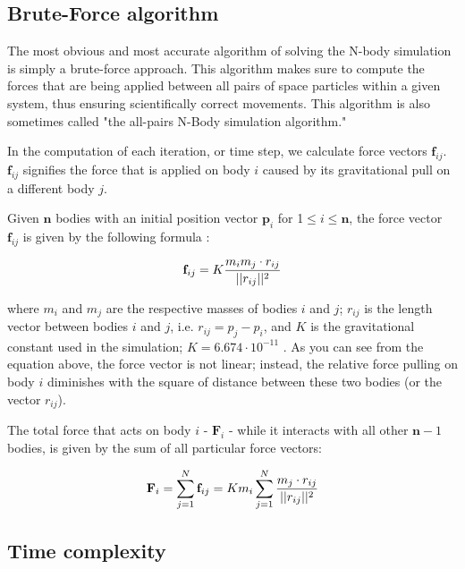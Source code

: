 \documentclass[journal]{IEEEtran}
\begin{document}
	\subsection*{Brute-Force algorithm}
		The most obvious and most accurate algorithm of solving the N-body simulation is simply a brute-force approach. This algorithm makes sure to compute the forces that are being applied between all pairs of space particles within a given system, thus ensuring scientifically correct movements. This algorithm is also sometimes called "the all-pairs N-Body simulation algorithm."
		
		In the computation of each iteration, or time step, we calculate force vectors $\textbf{f}_{ij}$. $\textbf{f}_{ij}$ signifies the force that is applied on body $i$ caused by its gravitational pull on a different body $j$. 
		
		Given $\textbf{n}$ bodies with an initial position vector $\textbf{p}_{i}$ for 1$ \leq i \leq \textbf{n}$, the force vector $\textbf{f}_{ij}$ is given by the following formula \cite{nvidia-article}:
		
		\begin{equation}
		\centering
			\textbf{f}_{ij} = K \frac{m_i m_j \cdot r_{ij}}{||r_{ij}||^2} 
		\end{equation}
		
		where $m_i$ and $m_j$ are the respective masses of bodies $i$ and $j$; $r_{ij}$ is the length vector between bodies $i$ and $j$, i.e. $r_{ij} = p_j - p_i$, and $K$ is the gravitational constant used in the simulation; $K = 6.674 \cdot 10^{-11}$ \cite{constant}. As you can see from the equation above, the force vector is not linear; instead, the relative force pulling on body $i$ diminishes with the square of distance between these two bodies (or the vector $r_{ij}$).
		
		The total force that acts on body $i$ - $\textbf{F}_i$ - while it interacts with all other $\textbf{n}-1$ bodies, is given by the sum of all particular force vectors:
		
		\begin{equation}
		\centering
			\textbf{F}_i = \sum_{j = 1}^{N}\textbf{f}_{ij}
			 = K m_i \sum_{j = 1}^{N}{\frac{m_j \cdot r_{ij}}{||r_{ij}||^2}}
		\end{equation}
		
		\subsection*{Time complexity}
		
\end{document}

